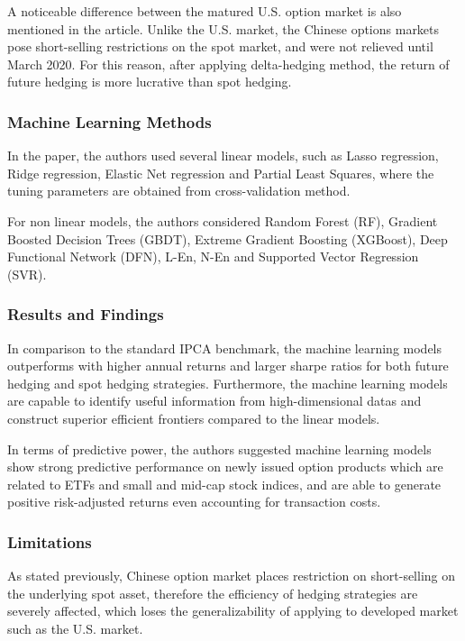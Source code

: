 \documentclass[oneside, 12pt]{article}
\newcommand*{\1}{\text{\scalebox{1.1}{\usefont{U}{bbold}{m}{n}1}}}
\begin{document}
A noticeable difference between the matured U.S. option market is also mentioned in the article. Unlike the U.S. market, the Chinese options markets pose short-selling restrictions on the spot market, and were not relieved until March 2020. For this reason, after applying delta-hedging method, the return of future hedging is more lucrative than spot hedging. 

\subsubsection{Machine Learning Methods}
In the paper, the authors used several linear models, such as Lasso regression, Ridge regression, Elastic Net regression and Partial Least Squares, where the tuning parameters are obtained from cross-validation method. \newline

For non linear models, the authors considered Random Forest (RF), Gradient Boosted Decision Trees (GBDT), Extreme Gradient Boosting (XGBoost), Deep Functional Network (DFN), L-En, N-En and Supported Vector Regression (SVR). 

\subsubsection{Results and Findings}
In comparison to the standard IPCA benchmark, the machine learning models outperforms with higher annual returns and larger sharpe ratios for both future hedging and spot hedging strategies. Furthermore,  the machine learning models are capable to identify useful information from high-dimensional datas and construct superior efficient frontiers compared to the linear models. \newline

In terms of predictive power, the authors suggested machine learning models show strong predictive performance on newly issued option products which are related to ETFs and small and mid-cap stock indices, and are able to generate positive risk-adjusted returns even accounting for transaction costs. 

\subsubsection{Limitations}
As stated previously, Chinese option market places restriction on short-selling on the underlying spot asset, therefore the efficiency of hedging strategies are severely affected, which loses the generalizability of applying to developed market such as the U.S. market. \newline
\end{document}
